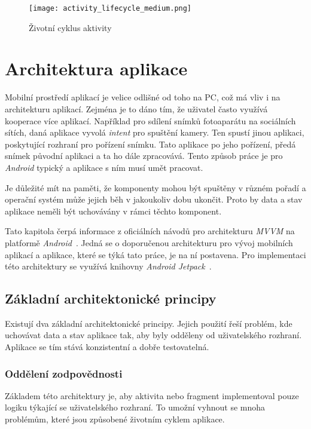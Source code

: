 \begin{figure}[h!]
    \centering
    \vspace{0.5cm}
    \texttt{[image: activity\_lifecycle\_medium.png]}
    \caption[Životní cyklus aktivity]{Životní cyklus aktivity~\cite{activity-life-cycle}}
    \label{diagram:activity_lifecycle}
\end{figure}

\newpage
\section{Architektura aplikace}
 Mobilní prostředí aplikací je velice odlišné od toho na PC, což má vliv i na architekturu aplikací. Zejména je to dáno tím, že uživatel často využívá kooperace více aplikací. Například pro sdílení snímků fotoaparátu na sociálních sítích, daná aplikace vyvolá \emph{intent} pro spuštění kamery. Ten spustí jinou aplikaci, poskytující rozhraní pro pořízení snímku. Tato aplikace po jeho pořízení, předá snímek původní aplikaci a ta ho dále zpracovává. Tento způsob práce je pro \emph{Android} typický a aplikace s ním musí umět pracovat.

 Je důležité mít na paměti, že komponenty mohou být spuštěny v různém pořadí a operační systém může jejich běh v jakoukoliv dobu ukončit. Proto by data a stav aplikace neměli být uchovávány v rámci těchto komponent.
 
 Tato kapitola čerpá informace z oficiálních návodů pro architekturu \emph{MVVM} na platformě \emph{Android}~. Jedná se o doporučenou architekturu pro vývoj mobilních aplikací a aplikace, které se týká tato práce, je na ní postavena. Pro implementaci této architektury se využívá knihovny \emph{Android Jetpack}~.

    \subsection{Základní architektonické principy}
    Existují dva základní architektonické principy. Jejich použití řeší problém, kde uchovávat data a stav aplikace tak, aby byly odděleny od uživatelského rozhraní. Aplikace se tím stává konzistentní a dobře testovatelná.

        \subsubsection{Oddělení zodpovědnosti}
        Základem této architektury je, aby aktivita nebo fragment implementoval pouze logiku týkající se uživatelského rozhraní. To umožní vyhnout se mnoha problémům, které jsou způsobené životním cyklem aplikace.

